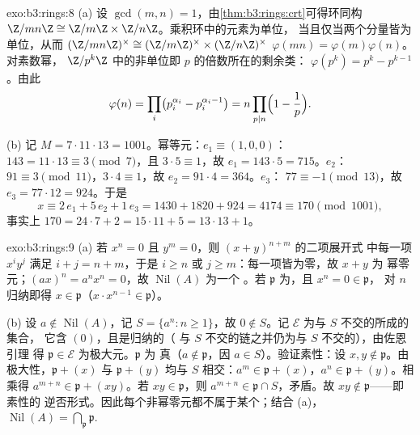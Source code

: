 \begin{solution}{exo:b3:rings:8}
(a) 设 $\gcd(m, n) = 1$，由\cref{thm:b3:rings:crt}可得环同构
$\Z/mn\Z \cong \Z/m\Z \times \Z/n\Z$。乘积环中的元素为单位，
当且仅当两个分量皆为单位，从而
$(\Z/mn\Z)^\times \cong (\Z/m\Z)^\times \times (\Z/n\Z)^\times$
$\varphi(mn) = \varphi(m)\varphi(n)$。对素数幂，
$\Z/p^k\Z$ 中的非单位即 $p$ 的倍数所在的剩余类：
$\varphi(p^k) = p^k - p^{k-1}$。由此
\[
\varphi(n) = \prod_i \bigl(p_i^{\alpha_i} -
p_i^{\alpha_i-1}\bigr) = n \prod_{p \mid n}\Bigl(1 -
\frac1p\Bigr).
\]

(b) 记 $M = 7 \cdot 11 \cdot 13 = 1001$。幂等元：$e_1 \equiv
(1, 0, 0)$：$143 = 11\cdot13 \equiv 3 \pmod 7$，且 $3 \cdot 5
\equiv 1$，故 $e_1 = 143 \cdot 5 = 715$。$e_2$：$91 \equiv 3
\pmod{11}$，$3 \cdot 4 \equiv 1$，故 $e_2 = 91\cdot4 = 364$。$e_3$：
$77 \equiv -1 \pmod{13}$，故 $e_3 = 77 \cdot 12 = 924$。于是
\[
x \equiv 2\,e_1 + 5\,e_2 + 1\,e_3 = 1430 + 1820 + 924 = 4174
\equiv 170 \pmod{1001},
\]
事实上 $170 = 24\cdot7 + 2 = 15\cdot11 + 5 = 13\cdot13 + 1$。
\end{solution}

\begin{solution}{exo:b3:rings:9}
(a) 若 $x^n = 0$ 且 $y^m = 0$，则 $(x+y)^{n+m}$ 的二项展开式
中每一项 $x^iy^j$ 满足 $i + j = n + m$，于是 $i
\geq n$ 或 $j \geq m$：每一项皆为零，故 $x + y$ 为
幂零元；$(ax)^n = a^nx^n = 0$，故 $\operatorname{Nil}(A)$ 为一个
。若 $\mathfrak p$ 为，且 $x^n = 0 \in \mathfrak p$，
对 $n$ 归纳即得 $x \in \mathfrak p$（$x \cdot x^{n-1} \in
\mathfrak p$）。

(b) 设 $a \notin \operatorname{Nil}(A)$，记 $S = \{a^n : n \geq
1\}$，故 $0 \notin S$。记 $\mathcal E$ 为与 $S$ 不交的所成的集合，
它含 $(0)$，且是归纳的（
与 $S$ 不交的链之并仍为与 $S$ 不交的），由佐恩引理
得 $\mathfrak p \in \mathcal E$ 为极大元。$\mathfrak p$ 为
真（$a \notin \mathfrak p$，因 $a \in S$）。验证素性：设
$x, y \notin \mathfrak p$。由极大性，$\mathfrak p + (x)$ 与
$\mathfrak p + (y)$ 均与 $S$ 相交：$a^m \in \mathfrak p + (x)$，$a^n
\in \mathfrak p + (y)$。相乘得 $a^{m+n} \in \mathfrak p +
(xy)$。若 $xy \in \mathfrak p$，则 $a^{m+n} \in \mathfrak p \cap
S$，矛盾。故 $xy \notin \mathfrak p$——即素性的
逆否形式。因此每个非幂零元都不属于某个；结合 (a)，
$\operatorname{Nil}(A) = \bigcap_{\mathfrak p} \mathfrak p$.
\end{solution}

